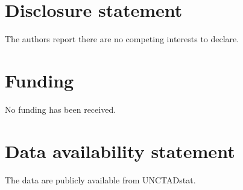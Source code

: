 \documentclass[12pt]{article}
\theoremstyle{definition}
\begin{document}

\section*{Disclosure statement}
The authors report there are no competing interests to declare.

\section*{Funding}
No funding has been received.

\section*{Data availability statement}
The data are publicly available from UNCTADstat.




\end{document}
